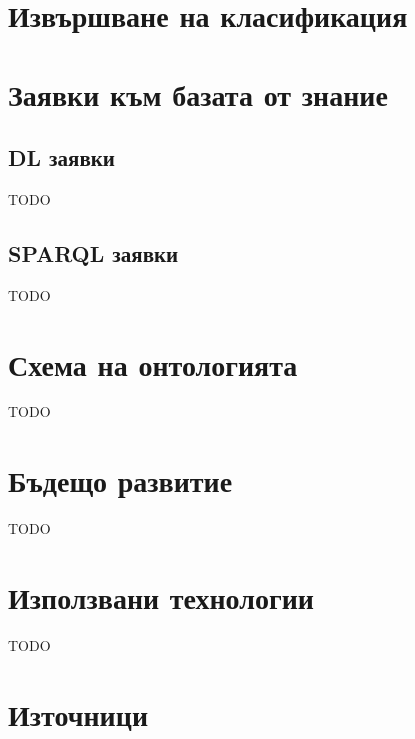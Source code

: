 \documentclass[12pt]{article}
\begin{document}
\section{Извършване на класификация}






\section{Заявки към базата от знание}

\subsection{DL заявки}

TODO

\subsection{SPARQL заявки}

TODO







\section{Схема на онтологията}

TODO



\section{Бъдещо развитие}

TODO




\section{Използвани технологии}

TODO







\listoffigures

\section{Източници}
\end{document}
